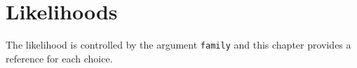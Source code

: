 \chapter{Likelihoods}
The likelihood is controlled by the argument \texttt{family} and this
chapter provides a reference for each choice.
\localtableofcontents

